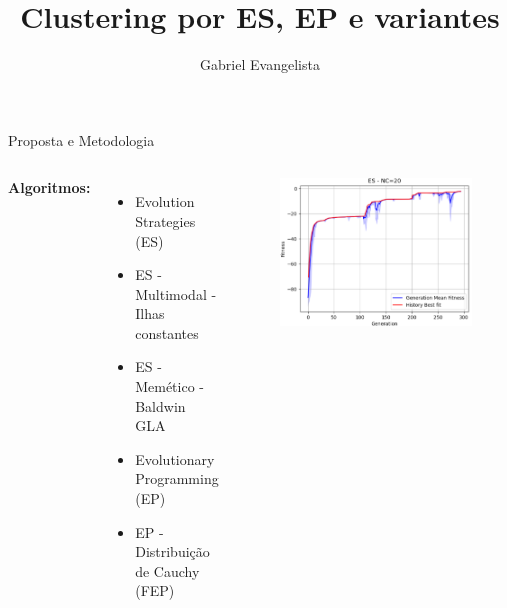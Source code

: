 \documentclass[pdf]{beamer}
\title{Clustering por ES, EP e variantes}
\author{Gabriel Evangelista}
\begin{document}
\begin{frame}{Proposta e Metodologia}
	\begin{columns}
		\textbf{Algoritmos:}
		\begin{itemize}
			\item Evolution Strategies (ES) 
			\item ES - Multimodal - Ilhas constantes
			\item ES - Memético - Baldwin GLA
			\item Evolutionary Programming (EP)
			\item EP - Distribuição de Cauchy (FEP)
	\end{itemize}

	\begin{figure}
		\includegraphics[width=.7\columnwidth]{img/ES_NC20_exemplo.png}
	\end{figure}	
	

%					
%



\end{columns}
\end{frame}
\end{document}
